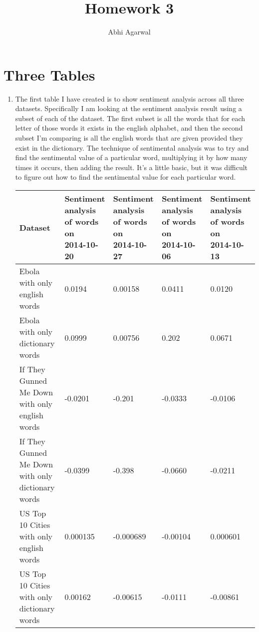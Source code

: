 \documentclass[11pt, oneside]{article}
\title{Homework 3}
\author{Abhi Agarwal}
\date{}
\makeatletter
\newcommand{\specialcell}[2][c]{%
  \begin{tabular}[#1]{@{}c@{}}#2\end{tabular}}
\makeatother
\begin{document}
\maketitle

\section*{Three Tables}
\begin{enumerate}
\item The first table I have created is to show sentiment analysis across all three datasets. Specifically I am looking at the sentiment analysis result using a subset of each of the dataset. The first subset is all the words that for each letter of those words it exists in the english alphabet, and then the second subset I'm comparing is all the english words that are given provided they exist in the dictionary. The technique of sentimental analysis was to try and find the sentimental value of a particular word, multiplying it by how many times it occurs, then adding the result. It's a little basic, but it was difficult to figure out how to find the sentimental value for each particular word.

\begin{tabularx}{\textwidth}{X|l|l|l|l}
\textbf{Dataset} & \specialcell{Sentiment \\analysis\\of words on\\\textbf{2014-10-20}} & \specialcell{Sentiment \\analysis\\of words on\\\textbf{2014-10-27}} & \specialcell{Sentiment \\analysis\\of words on\\\textbf{2014-10-06}} & \specialcell{Sentiment\\ analysis\\of words on\\\textbf{2014-10-13}} \\
\hline Ebola with only english words & 0.0194 & 0.00158 & 0.0411 & 0.0120 \\ 
\hline Ebola with only dictionary words & 0.0999 & 0.00756 & 0.202 & 0.0671 \\ 
\hline If They Gunned Me Down with only english words & -0.0201 & -0.201 & -0.0333 & -0.0106 \\ 
\hline If They Gunned Me Down with only dictionary words & -0.0399 & -0.398 & -0.0660 & -0.0211 \\ 
\hline US Top 10 Cities with only english words & 0.000135 & -0.000689 & -0.00104 & 0.000601 \\ 
\hline US Top 10 Cities with only dictionary words & 0.00162 & -0.00615 & -0.0111 & -0.00861 \\ 
\hline \end{tabularx}


\end{enumerate}
\end{document}
